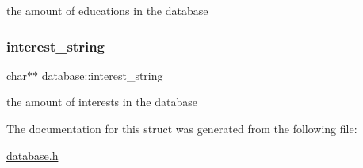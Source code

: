 the amount of educations in the database \mbox{\label{structdatabase_aa677885704df7723ae0211e7f8977cc0}} 
\subsubsection{\texorpdfstring{interest\+\_\+string}{interest\_string}}
{\footnotesize\ttfamily char$\ast$$\ast$ database\+::interest\+\_\+string}

the amount of interests in the database 

The documentation for this struct was generated from the following file\+:\begin{DoxyCompactItemize}
\item 
\hyperlink{database_8h}{database.\+h}\end{DoxyCompactItemize}
